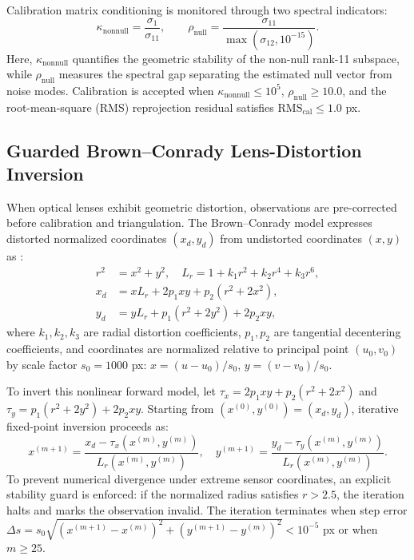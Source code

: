 \documentclass[a4paper,conference]{IEEEtran}
\begin{document}
Calibration matrix conditioning is monitored through two spectral indicators:
\begin{equation}
\kappa_{\mathrm{nonnull}} = \frac{\sigma_1}{\sigma_{11}}, \qquad \rho_{\mathrm{null}} = \frac{\sigma_{11}}{\max(\sigma_{12}, 10^{-15})}.
\label{eq:caldiag}
\end{equation}
Here, $\kappa_{\mathrm{nonnull}}$ quantifies the geometric stability of the non-null rank-11 subspace, while $\rho_{\mathrm{null}}$ measures the spectral gap separating the estimated null vector from noise modes. Calibration is accepted when $\kappa_{\mathrm{nonnull}} \le 10^5$, $\rho_{\mathrm{null}} \ge 10.0$, and the root-mean-square (RMS) reprojection residual satisfies $\mathrm{RMS}_{\mathrm{cal}} \le 1.0$ px.

\subsection{Guarded Brown--Conrady Lens-Distortion Inversion}
When optical lenses exhibit geometric distortion, observations are pre-corrected before calibration and triangulation. The Brown--Conrady model expresses distorted normalized coordinates $(x_d, y_d)$ from undistorted coordinates $(x, y)$ as \cite{brown}:
\begin{align}
r^2 &= x^2 + y^2, \quad L_r = 1 + k_1 r^2 + k_2 r^4 + k_3 r^6, \\
x_d &= x L_r + 2 p_1 x y + p_2 (r^2 + 2 x^2), \\
y_d &= y L_r + p_1 (r^2 + 2 y^2) + 2 p_2 x y,
\label{eq:brown}
\end{align}
where $k_1, k_2, k_3$ are radial distortion coefficients, $p_1, p_2$ are tangential decentering coefficients, and coordinates are normalized relative to principal point $(u_0, v_0)$ by scale factor $s_0 = 1000$ px: $x = (u - u_0)/s_0$, $y = (v - v_0)/s_0$.

To invert this nonlinear forward model, let $\tau_x = 2 p_1 x y + p_2(r^2 + 2x^2)$ and $\tau_y = p_1(r^2 + 2y^2) + 2p_2xy$. Starting from $(x^{(0)}, y^{(0)}) = (x_d, y_d)$, iterative fixed-point inversion proceeds as:
\begin{equation}
x^{(m+1)} = \frac{x_d - \tau_x(x^{(m)}, y^{(m)})}{L_r(x^{(m)}, y^{(m)})}, \quad
y^{(m+1)} = \frac{y_d - \tau_y(x^{(m)}, y^{(m)})}{L_r(x^{(m)}, y^{(m)})}.
\label{eq:undistort}
\end{equation}
To prevent numerical divergence under extreme sensor coordinates, an explicit stability guard is enforced: if the normalized radius satisfies $r > 2.5$, the iteration halts and marks the observation invalid. The iteration terminates when step error $\Delta s = s_0 \sqrt{(x^{(m+1)} - x^{(m)})^2 + (y^{(m+1)} - y^{(m)})^2} < 10^{-5}$ px or when $m \ge 25$.
\end{document}
